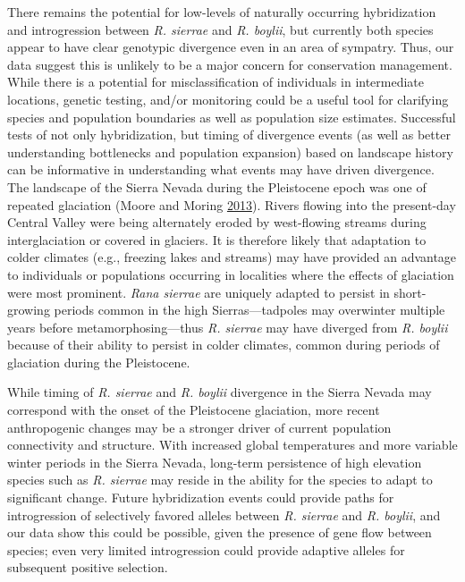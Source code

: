 \documentclass[proquest,12pt,final]{ucthesis-CA2012} %
\begin{document}
\begin{ucmainmatter}
There remains the potential for low-levels of naturally occurring
hybridization and introgression between \emph{R. sierrae} and \emph{R.
boylii}, but currently both species appear to have clear genotypic
divergence even in an area of sympatry. Thus, our data suggest this is
unlikely to be a major concern for conservation management. While there
is a potential for misclassification of individuals in intermediate
locations, genetic testing, and/or monitoring could be a useful tool for
clarifying species and population boundaries as well as population size
estimates. Successful tests of not only hybridization, but timing of
divergence events (as well as better understanding bottlenecks and
population expansion) based on landscape history can be informative in
understanding what events may have driven divergence. The landscape of
the Sierra Nevada during the Pleistocene epoch was one of repeated
glaciation (Moore and Moring
\protect\hyperlink{ref-moore_rangewide_2013}{2013}). Rivers flowing into
the present-day Central Valley were being alternately eroded by
west-flowing streams during interglaciation or covered in glaciers. It
is therefore likely that adaptation to colder climates (e.g., freezing
lakes and streams) may have provided an advantage to individuals or
populations occurring in localities where the effects of glaciation were
most prominent. \emph{Rana sierrae} are uniquely adapted to persist in
short-growing periods common in the high Sierras---tadpoles may
overwinter multiple years before metamorphosing---thus \emph{R. sierrae}
may have diverged from \emph{R. boylii} because of their ability to
persist in colder climates, common during periods of glaciation during
the Pleistocene.

While timing of \emph{R. sierrae} and \emph{R. boylii} divergence in the
Sierra Nevada may correspond with the onset of the Pleistocene
glaciation, more recent anthropogenic changes may be a stronger driver
of current population connectivity and structure. With increased global
temperatures and more variable winter periods in the Sierra Nevada,
long-term persistence of high elevation species such as \emph{R.
sierrae} may reside in the ability for the species to adapt to
significant change. Future hybridization events could provide paths for
introgression of selectively favored alleles between \emph{R. sierrae}
and \emph{R. boylii}, and our data show this could be possible, given
the presence of gene flow between species; even very limited
introgression could provide adaptive alleles for subsequent positive
selection.


\end{ucmainmatter}
\end{document}

